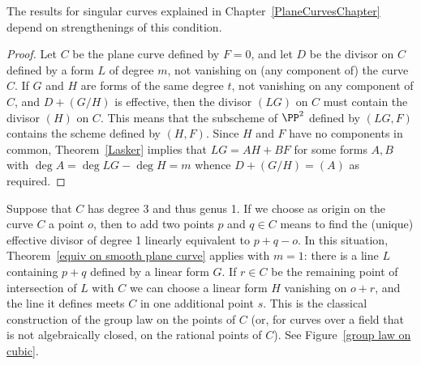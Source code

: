  The results for singular curves explained in Chapter~\ref{PlaneCurvesChapter}
 depend on strengthenings  of this condition.
 
\begin{proof}
Let $C$ be the plane curve defined by $F=0$, and let $D$ be the divisor on $C$ defined by a form $L$
of degree $m$, not vanishing on (any component of) the curve $C$. If $G$ and $H$ are forms of the same degree $t$, 
not vanishing on any component of $C$,
and $D+(G/H)$ is effective, then the divisor $(LG)$  on $C$ must contain the divisor $(H)$ on $C$.
This means that the subscheme of $\PP^{2}$ defined by $(LG,F)$ contains the scheme defined 
by $(H,F)$. Since $H$ and $F$ have no components in common, Theorem~\ref{Lasker} implies
that $LG = AH+BF$  for some forms $A,B$ with $\deg A = \deg LG -\deg H = m$ whence $D+(G/H) = (A)$
as required.
\end{proof}

\begin{example}
Suppose that $C$ has degree 3 and thus genus 1. If we choose as origin on the curve $C$ a point $o$, then to add two points $p$ and $q \in C$ means to find the (unique) effective divisor of degree 1 linearly equivalent to $p + q - o$. In this situation, Theorem~\ref{equiv on smooth plane curve} applies with $m=1$: there is a line $L$ 
containing $p+q$ defined by a linear form $G$. If $r \in C$ be the remaining point of intersection of $L$ with $C$ we can choose a linear form $H$ vanishing on $o+r$, and the line it defines meets $C$
in one additional point $s$. This is the classical construction of the group law on the points of $C$ (or,
for curves over a field that is not algebraically closed, on the rational points of $C$).
See Figure~\ref{group law on cubic}.
\end{example}


